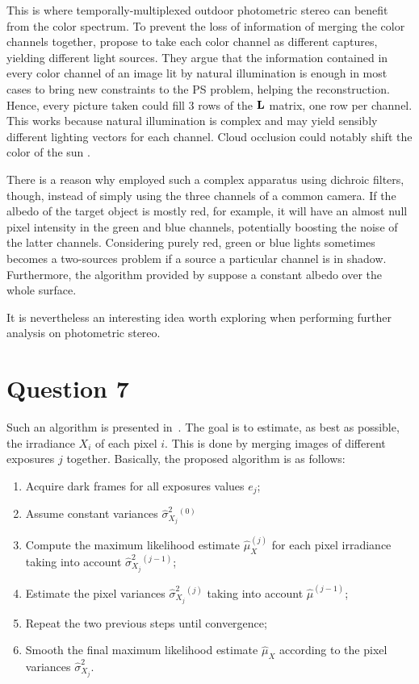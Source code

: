 \documentclass{report}
\begin{document}
This is where temporally-multiplexed outdoor photometric stereo can benefit from the color spectrum. To prevent the loss of information of merging the color channels together, \cite{johnson-cvpr-11} propose to take each color channel as different captures, yielding different light sources. They argue that the information contained in every color channel of an image lit by natural illumination is enough in most cases to bring new constraints to the PS problem, helping the reconstruction. Hence, every picture taken could fill 3 rows of the $\mathbf{L}$ matrix, one row per channel. This works because natural illumination is complex and may yield sensibly different lighting vectors for each channel. Cloud occlusion could notably shift the color of the sun .

There is a reason why \cite{Fyffe2011} employed such a complex apparatus using dichroic filters, though, instead of simply using the three channels of a common camera. If the albedo of the target object is mostly red, for example, it will have an almost null pixel intensity in the green and blue channels, potentially boosting the noise of the latter channels.  Considering purely red, green or blue lights sometimes becomes a two-sources problem if a source a particular channel is in shadow. Furthermore, the algorithm provided by \cite{johnson-cvpr-11} suppose a constant albedo over the whole surface.

It is nevertheless an interesting idea worth exploring when performing further analysis on photometric stereo.

\section{Question 7}

Such an algorithm is presented in~\cite{Granados2010a}. The goal is to estimate, as best as possible, the irradiance $X_i$ of each pixel $i$. This is done by merging images of different exposures $j$ together. Basically, the proposed algorithm is as follows:
\begin{enumerate}
  \item{Acquire dark frames for all exposures values $e_j$;}
  \item{Assume constant variances $\hat{\sigma}_{X_j}^2{}^{(0)}$}
  \item{Compute the maximum likelihood estimate $\hat{\mu}_X^{(j)}$ for each pixel irradiance taking into account $\hat{\sigma}_{X_j}^2{}^{(j-1)}$;}
  \item{Estimate the pixel variances $\hat{\sigma}_{X_j}^2{}^{(j)}$ taking into account $\hat{\mu}^{(j-1)}$;}
  \item{Repeat the two previous steps until convergence;}
  \item{Smooth the final maximum likelihood estimate $\hat{\mu}_X$ according to the pixel variances $\hat{\sigma}_{X_j}^2$}.
\end{enumerate}
\end{document}
